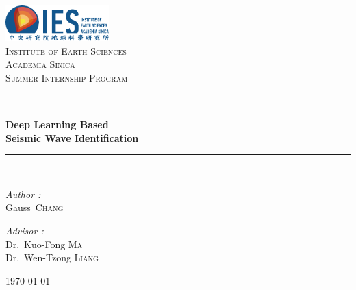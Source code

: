 \documentclass[a4paper,12pt, oneside]{article}
\newcommand{\HRule}{\rule{\linewidth}{2pt}}
\begin{document}

\begin{titlepage}

\begin{center}


\includegraphics[width = 0.30\textwidth]{IES_logo.pdf} \\ [1cm]
\textsc{\LARGE Institute of Earth Sciences \\ Academia Sinica} \\ [1.5cm]
\textsc{\Large Summer Internship Program} \\ [0.5cm]


\HRule \\ %
{\huge \bfseries Deep Learning Based \\ Seismic Wave Identification} \\ [0.5cm]
\HRule \\ [2.5cm]

\begin{minipage}[t]{0.4\textwidth}
\begin{flushleft} \large
\emph{Author :}\\
Gauss~\textsc{Chang} \\
\end{flushleft}
\end{minipage}
%
\begin{minipage}[t]{0.4\textwidth}
\begin{flushright} \large
\emph{Advisor :} \\
Dr.~Kuo-Fong \textsc{Ma} \\
Dr.~Wen-Tzong \textsc{Liang} \\
\end{flushright}
\end{minipage}

\vfill

{\large \today}

\end{center}

\end{titlepage}
\setcounter{page}{1}

\end{document}
